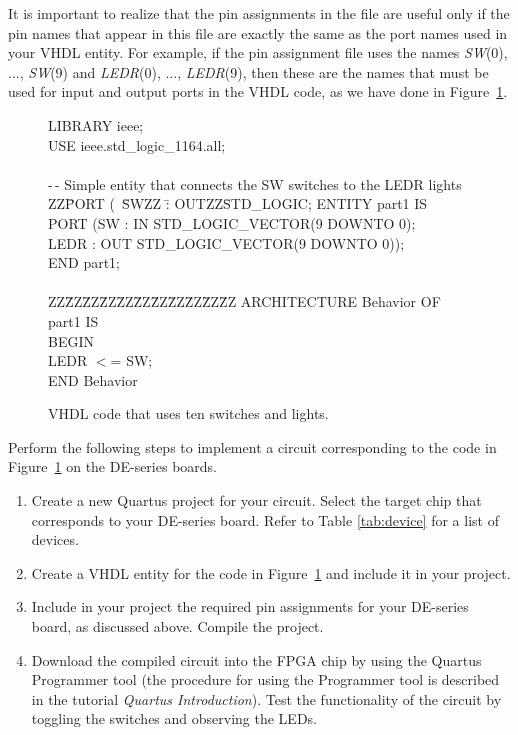 \documentclass[epsfig,10pt,fullpage]{article}
\begin{document}
It is important to realize that the pin assignments in the
file are useful only if the pin names that appear in this file
are exactly the same as the port names used in your VHDL entity.
For example, if the pin assignment file uses the names {\it SW}(0), $\ldots$, {\it SW}(9) 
and {\it LEDR}(0), $\ldots$, {\it LEDR}(9), then these are the names that must be used
for input and output ports in the VHDL code, as we have done in Figure~\ref{fig:1}.

\begin{figure}[H]
\begin{center}
\begin{minipage}[t]{12.5 cm}
\begin{tabbing}
LIBRARY ieee;\\
USE ieee.std\_logic\_1164.all;\\
~\\
-\,- Simple entity that connects the SW switches to the LEDR lights\\
ZZ\=PORT (~\=SWZZ \=: OUTZZ\=STD\_LOGIC;\kill
ENTITY part1 IS \\
\>PORT (\>SW \>: IN \>STD\_LOGIC\_VECTOR(9 DOWNTO 0);\\
\>\>LEDR \>: OUT \>STD\_LOGIC\_VECTOR(9 DOWNTO 0));\\
END part1;\\
~\\
ZZ\=ZZ\=ZZ\=ZZ\=ZZ\=ZZ\=ZZ\=ZZ\=ZZ\=ZZ\=ZZ\kill
ARCHITECTURE Behavior OF part1 IS\\
BEGIN\\
\>LEDR $<$= SW;\\
END Behavior\\
\end{tabbing}
\end{minipage}
	\caption{VHDL code that uses ten switches and lights.}
	\label {fig:1}
\end{center}
\end{figure}

\newpage
Perform the following steps to implement a circuit corresponding to the code
in  Figure~\ref{fig:1} on the DE-series boards.
\begin{enumerate}
\item Create a new Quartus project for your circuit. Select the target chip that corresponds to your DE-series board.
Refer to Table \ref{tab:device} for a list of devices.
\item Create a VHDL entity for the code in  Figure~\ref{fig:1} and include it in your project.
\item Include in your project the required pin assignments for your DE-series board, as discussed
above. Compile the project.
\item Download the compiled circuit into the FPGA chip by using the Quartus Programmer
tool (the procedure for using the Programmer tool is described in
the tutorial {\it Quartus Introduction}). Test the functionality of the 
circuit by toggling the switches and observing the LEDs.
\end{enumerate}
\end{document}
